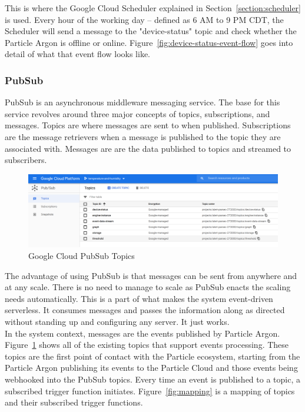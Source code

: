 \documentclass{article}
\begin{document}
This is where the Google Cloud Scheduler explained in Section~\ref{section:scheduler} is used. Every hour of the working day -- defined as 6 AM to 9 PM CDT, the Scheduler will send a message to the "device-status" topic and check whether the Particle Argon is offline or online. Figure~\ref{fig:device-status-event-flow} goes into detail of what that event flow looks like.

\subsubsection{PubSub}
\label{section:pubsub}
PubSub is an asynchronous middleware messaging service. The base for this service revolves around three major concepts of topics, subscriptions, and messages. Topics are where messages are sent to when published. Subscriptions are the message retrievers when a message is published to the topic they are associated with. Messages are are the data published to topics and streamed to subscribers.

\begin{figure}[H]
	\center
	\includegraphics[width=\textwidth]{images/pubsub-topics.png}
	\caption{Google Cloud PubSub Topics}
	\label{fig:pubsub-topics}
\end{figure}

The advantage of using PubSub is that messages can be sent from anywhere and at any scale. There is no need to manage to scale as PubSub enacts the scaling needs automatically. This is a part of what makes the system event-driven serverless. It consumes messages and passes the information along as directed without standing up and configuring any server. It just works.\\

In the system context, messages are the events published by Particle Argon. Figure~\ref{fig:pubsub-topics} shows all of the existing topics that support events processing. These topics are the first point of contact with the Particle ecosystem, starting from the Particle Argon publishing its events to the Particle Cloud and those events being webhooked into the PubSub topics. Every time an event is published to a topic, a subscribed trigger function initiates. Figure~\ref{fig:mapping} is a mapping of topics and their subscribed trigger functions.\\
\end{document}
